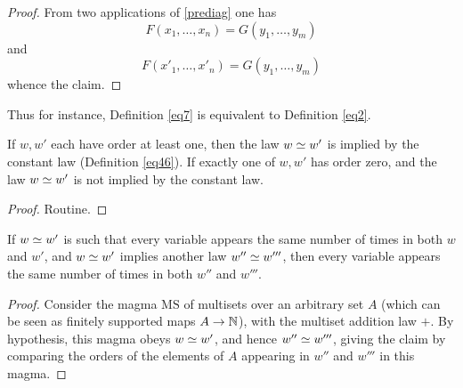 \begin{proof}  From two applications of \eqref{prediag} one has
$$ F(x_1,\dots,x_n) = G(y_1,\dots,y_m)$$
and
$$ F(x'_1,\dots,x'_n) = G(y_1,\dots,y_m)$$
whence the claim.
\end{proof}

Thus for instance, Definition \ref{eq7} is equivalent to Definition \ref{eq2}.

\begin{theorem}\label{constant-impl}  If $w, w'$ each have order at least one, then the law $w \simeq w'$ is implied by the constant law (Definition \ref{eq46}).  If exactly one of $w, w'$ has order zero, and the law $w \simeq w'$ is not implied by the constant law.
\end{theorem}

\begin{proof} Routine.
\end{proof}

\begin{theorem}\label{variable-impl}\leanok  If $w \simeq w'$ is such that every variable appears the same number of times in both $w$ and $w'$, and $w \simeq w'$ implies another law $w'' \simeq w'''$, then every variable appears the same number of times in both $w''$ and $w'''$.
\end{theorem}

\begin{proof} Consider the magma $\mathrm{MS}$ of multisets over an arbitrary set $A$ (which can be seen as finitely supported maps $A\rightarrow \mathbb{N}$), with the multiset addition law $+$.  By hypothesis, this magma obeys $w \simeq w'$, and hence $w'' \simeq w'''$, giving the claim by comparing the orders of the elements of $A$ appearing in $w''$ and $w'''$ in this magma.
\end{proof}
